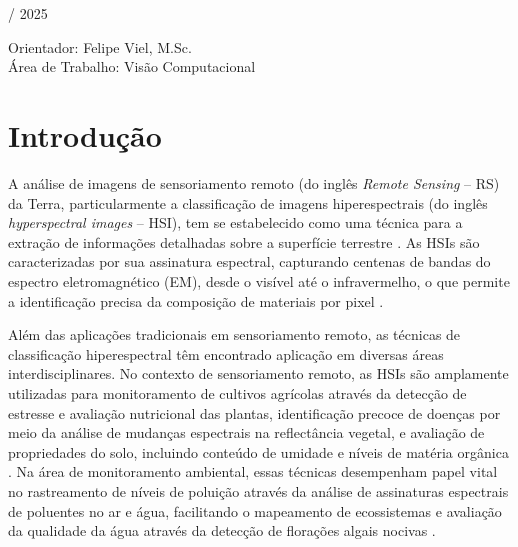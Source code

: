 \documentclass[a4paper,12pt,brazil]{article} %
\begin{document}
 \clearpage



\begin{center}

\\


\vspace{3\bigskipamount}

 \\ 
 / 2025

\end{center}

\vspace{4\bigskipamount}

\noindent
Orientador: Felipe Viel, M.Sc. \\ 
Área de Trabalho: Visão Computacional\\




\section{Introdução}

A análise de imagens de sensoriamento remoto (do inglês \textit{Remote Sensing} -- RS) da Terra, particularmente a classificação de imagens hiperespectrais (do inglês \textit{hyperspectral images} -- HSI), tem se estabelecido como uma técnica para a extração de informações detalhadas sobre a superfície terrestre \cite{lary2016machine}. As HSIs são caracterizadas por sua assinatura espectral, capturando centenas de bandas do espectro eletromagnético (EM), desde o visível até o infravermelho, o que permite a identificação precisa da composição de materiais por pixel \cite{xia2015random, bera2020analysis}.

Além das aplicações tradicionais em sensoriamento remoto, as técnicas de classificação hiperespectral têm encontrado aplicação em diversas áreas interdisciplinares. No contexto de sensoriamento remoto, as HSIs são amplamente utilizadas para monitoramento de cultivos agrícolas através da detecção de estresse e avaliação nutricional das plantas, identificação precoce de doenças por meio da análise de mudanças espectrais na reflectância vegetal, e avaliação de propriedades do solo, incluindo conteúdo de umidade e níveis de matéria orgânica \cite{thenkabail2000hyperspectral, deng2024rustqnet}. Na área de monitoramento ambiental, essas técnicas desempenham papel vital no rastreamento de níveis de poluição através da análise de assinaturas espectrais de poluentes no ar e água, facilitando o mapeamento de ecossistemas e avaliação da qualidade da água através da detecção de florações algais nocivas \cite{zheng2019sparse}.
\end{document}

